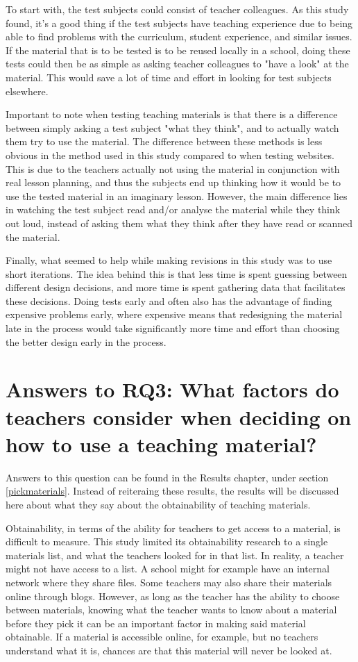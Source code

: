 To start with, the test subjects could consist of teacher colleagues. As this study found, it's a good thing if the test subjects have teaching experience due to being able to find problems with the curriculum, student experience, and similar issues. If the material that is to be tested is to be reused locally in a school, doing these tests could then be as simple as asking teacher colleagues to "have a look" at the material. This would save a lot of time and effort in looking for test subjects elsewhere.

Important to note when testing teaching materials is that there is a difference between simply asking a test subject "what they think", and to actually watch them try to use the material. The difference between these methods is less obvious in the method used in this study compared to when testing websites. This is due to the teachers actually not using the material in conjunction with real lesson planning, and thus the subjects end up thinking how it would be to use the tested material in an imaginary lesson. However, the main difference lies in watching the test subject read and/or analyse the material while they think out loud, instead of asking them what they think after they have read or scanned the material.

Finally, what seemed to help while making revisions in this study was to use short iterations. The idea behind this is that less time is spent guessing between different design decisions, and more time is spent gathering data that facilitates these decisions. Doing tests early and often also has the advantage of finding expensive problems early, where expensive means that redesigning the material late in the process would take significantly more time and effort than choosing the better design early in the process.

\section{Answers to RQ3: What factors do teachers consider when deciding on how to use a teaching material?}

Answers to this question can be found in the Results chapter, under section \ref{pickmaterials}. Instead of reiteraing these results, the results will be discussed here about what they say about the obtainability of teaching materials.

Obtainability, in terms of the ability for teachers to get access to a material, is difficult to measure. This study limited its obtainability research to a single materials list, and what the teachers looked for in that list. In reality, a teacher might not have access to a list. A school might for example have an internal network where they share files. Some teachers may also share their materials online through blogs. However, as long as the teacher has the ability to choose between materials, knowing what the teacher wants to know about a material before they pick it can be an important factor in making said material obtainable. If a material is accessible online, for example, but no teachers understand what it is, chances are that this material will never be looked at.

